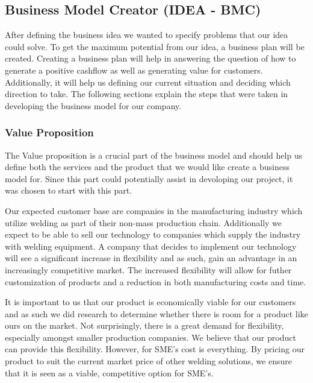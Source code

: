 \subsection{Business Model Creator (IDEA - BMC)}
\begin{figure}

\end{figure}

After defining the business idea we wanted to specify problems that our idea could solve. 
To get the maximum potential from our idea, a business plan will be created. 
Creating a business plan will help in answering the question of how to generate a positive cashflow as well as generating value for customers. 
Additionally, it will help us defining our current situation and deciding which direction to take. The following sections explain the steps that were taken in developing the business model for our company.

\subsubsection{Value Proposition}
The Value proposition is a crucial part of the business model and should help us define both the services and the product that we would like create a business model for. 
Since this part could potentially assist in devoloping our project, it was chosen to start with this part.

Our expected customer base are companies in the manufacturing industry which utilize welding as part of their non-mass production chain. 
Additionally we expect to be able to sell our technology to companies which supply the industry with welding equipment. 
A company that decides to implement our technology will see a significant increase in flexibility and as such, gain an advantage in an increasingly competitive market. 
The increased flexibility will allow for futher customization of products and a reduction in both manufacturing costs and time.

It is important to us that our product is economically viable for our customers and as such we did research to determine whether there is room for a product like ours on the market.
Not surprisingly, there is a great demand for flexibility, especially amongst smaller production companies. 
We believe that our product can provide this flexibility.
However, for SME's cost is everything. By pricing our product to suit the current market price of other welding solutions, we ensure that it is seen as a viable, competitive option for SME's.

